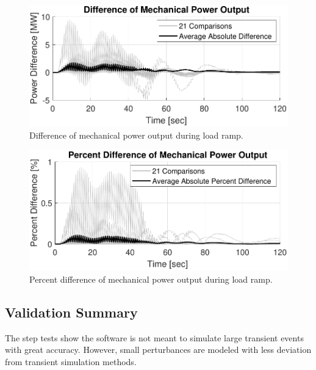 \begin{figure}[!ht]
	\centering
	\includegraphics[width=\linewidth]{figures/miniWECC3ALTDrampPm2}
	\caption{Difference of mechanical power output during load ramp.}
	\label{fig: rampPmdif}
\end{figure}

\begin{figure}[!ht]
	\centering
	\includegraphics[width=\linewidth]{figures/miniWECC3ALTDrampPm3}
	\caption{Percent difference of mechanical power output during load ramp.}
	\label{fig: rampPmPercentdif}
\end{figure}
\subsection{Validation Summary}
The step tests show the software is not meant to simulate large transient events with great accuracy.
However, small perturbances are modeled with less deviation from transient simulation methods.